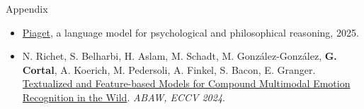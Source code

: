 \documentclass[handout,10pt]{beamer}
\begin{document}
\begin{frame}{Appendix}

\begin{itemize}
    \item \href{https://huggingface.co/gustavecortal/Piaget-8B}{Piaget}, a language model for psychological and philosophical reasoning, 2025.
    \item N. Richet, S. Belharbi, H. Aslam, M. Schadt, M. González-González, \textbf{G. Cortal}, A. Koerich, M. Pedersoli, A. Finkel, S. Bacon, E. Granger. \href{https://arxiv.org/abs/2407.12927}{Textualized and Feature-based Models for Compound Multimodal Emotion Recognition in the Wild}. \textit{ABAW, ECCV 2024}.
\end{itemize}
    
\end{frame}
\end{document}
